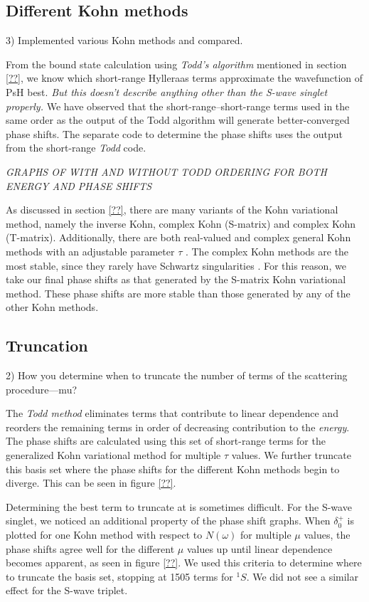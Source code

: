 \documentclass[preprint,showpacs,preprintnumbers,amsmath,amssymb]{revtex4}
\begin{document}
\subsection{Different Kohn methods}
3) Implemented various Kohn methods and compared.

From the bound state calculation using \emph{Todd's algorithm} mentioned in section \ref{??}, we know which short-range Hylleraas terms approximate the wavefunction of PsH best. \emph{But this doesn't describe anything other than the S-wave singlet properly.} We have observed that the short-range--short-range terms used in the same order as the output of the Todd algorithm will generate better-converged phase shifts. The separate code to determine the phase shifts uses the output from the short-range \emph{Todd} code.

\emph{GRAPHS OF WITH AND WITHOUT TODD ORDERING FOR BOTH ENERGY AND PHASE SHIFTS}

As discussed in section \ref{??}, there are many variants of the Kohn variational method, namely the inverse Kohn, complex Kohn (S-matrix) and complex Kohn (T-matrix). Additionally, there are both real-valued and complex general Kohn methods with an adjustable parameter $\tau$ \cite{??}. The complex Kohn methods are the most stable, since they rarely have Schwartz singularities \cite{CooperOrLucchese??}. For this reason, we take our final phase shifts as that generated by the S-matrix Kohn variational method. These phase shifts are more stable than those generated by any of the other Kohn methods.

\subsection{Truncation}
2) How you determine when to truncate the number of terms of the scattering procedure---mu?

The \emph{Todd method} eliminates terms that contribute to linear dependence and reorders the remaining terms in order of decreasing contribution to the \emph{energy}. The phase shifts are calculated using this set of short-range terms for the generalized Kohn variational method for multiple $\tau$ values. We further truncate this basis set where the phase shifts for the different Kohn methods begin to diverge. This can be seen in figure \ref{??}.

Determining the best term to truncate at is sometimes difficult. For the S-wave singlet, we noticed an additional property of the phase shift graphs. When $\delta_0^+$ is plotted for one Kohn method with respect to $N(\omega)$ for multiple $\mu$ values, the phase shifts agree well for the different $\mu$ values up until linear dependence becomes apparent, as seen in figure \ref{??}. We used this criteria to determine where to truncate the basis set, stopping at 1505 terms for $^1S$. We did not see a similar effect for the S-wave triplet.
\end{document}
